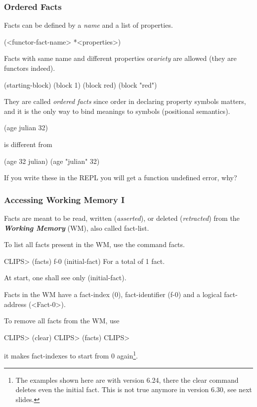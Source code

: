 \documentclass[xcolor={usenames,dvipsnames,svgnames}, compress]{beamer}
\begin{document}
\begin{frame}[fragile]
  \frametitle{Ordered Facts}

  Facts can be defined by a \emph{name} and a list of properties.
  \begin{clips-code}[numbers=none]
    (<functor-fact-name> *<properties>)
  \end{clips-code}
  Facts with same name and different properties or\emph{ariety} are allowed (they
  are functors indeed).
  \begin{clips-code}[numbers=none]
    (starting-block)    (block 1)    (block red)   (block  "red")
  \end{clips-code}
  They are called \emph{ordered facts} since order in declaring property
  symbols matters, and it is the only way to bind meanings to symbols (positional semantics).
  \begin{clips-code}[numbers=none]
    (age julian 32)
  \end{clips-code}
  is different from
  \begin{clips-code}[numbers=none]
    (age 32 julian)    (age "julian" 32)
  \end{clips-code}
  If you write these in the REPL you will get a function undefined
  error, why?
\end{frame}

\begin{frame}[fragile]
  \frametitle{Accessing Working Memory I}
   Facts are meant to be read, written (\emph{asserted}), or deleted
  (\emph{retracted}) from the \textbf{\emph{Working Memory}}
  (WM), also called \textsf{fact-list}.\par\bigskip
  
  To list all facts present in the WM, use the command \textsf{facts}.
  \begin{clips-code}
    CLIPS> (facts)
    f-0     (initial-fact)
    For a total of 1 fact.
     \end{clips-code}
  At start, one shall see only \textsf{(initial-fact)}.\par
  
  Facts in the WM have a \textsf{fact-index} (0),
  \textsf{fact-identifier} (f-0) and a logical \textsf{fact-address} (<Fact-0>).
  
  To remove all facts from the WM, use
  \begin{clips-code}[firstnumber=4]
    CLIPS> (clear)
    CLIPS> (facts)
    CLIPS>
  \end{clips-code}
  it makes \textsf{fact-index}es to start from 0 again\footnote{The
    examples shown here are with version 6.24, there the clear command
  deletes even the initial fact. This is not true anymore in version
  6.30, see next slides.}.\par
  
\end{frame}
\end{document}
